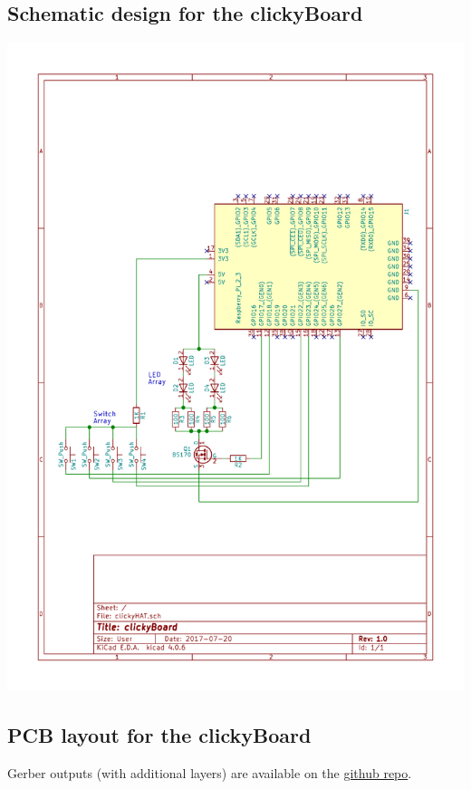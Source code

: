 \documentclass[10pt, a4paper, onesided]{article}
\begin{document}
	\subsection{Schematic design for the clickyBoard}
		\begin{center}
			\includegraphics[width=1\linewidth]{img/schematic}
		\end{center}
	
	\newpage
	\subsection{PCB layout for the clickyBoard}
		Gerber outputs (with additional layers) are available on the \href{https://github.com/SecretImbecile/clickyBoard}{github repo}.
\end{document}
